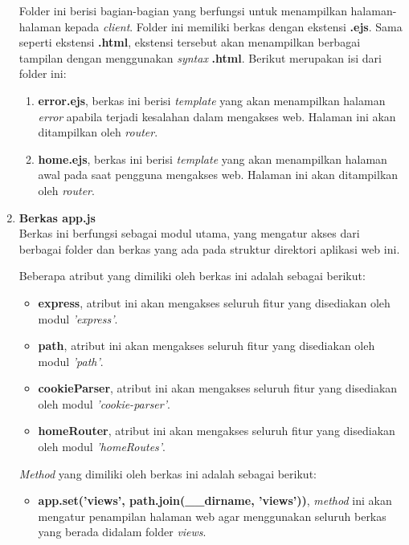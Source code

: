 \begin{enumerate}
	Folder ini berisi bagian-bagian yang berfungsi untuk menampilkan halaman-halaman kepada \textit{client}. Folder ini memiliki berkas dengan ekstensi \textbf{.ejs}. Sama seperti ekstensi \textbf{.html}, ekstensi tersebut akan menampilkan berbagai tampilan dengan menggunakan \textit{syntax} \textbf{.html}. Berikut merupakan isi dari folder ini:
	
	\begin{enumerate}
		\item \textbf{error.ejs}, berkas ini berisi \textit{template} yang akan menampilkan halaman \textit{error} apabila terjadi kesalahan dalam mengakses web. Halaman ini akan ditampilkan oleh \textit{router}.
		
		\item \textbf{home.ejs}, berkas ini berisi \textit{template} yang akan menampilkan halaman awal pada saat pengguna mengakses web. Halaman ini akan ditampilkan oleh \textit{router}.
	\end{enumerate}
	
	
	\item \textbf{Berkas app.js} \\ 
	Berkas ini berfungsi sebagai modul utama, yang mengatur akses dari berbagai folder dan berkas yang ada pada struktur direktori aplikasi web ini.
	
	Beberapa atribut yang dimiliki oleh berkas ini adalah sebagai berikut:
	\begin{itemize}
		\item \textbf{express}, atribut ini akan mengakses seluruh fitur yang disediakan oleh modul \textit{'express'}.
		
		\item \textbf{path}, atribut ini akan mengakses seluruh fitur yang disediakan oleh modul \textit{'path'}.
		
		\item \textbf{cookieParser}, atribut ini akan mengakses seluruh fitur yang disediakan oleh modul \textit{'cookie-parser'}.
		
		\item \textbf{homeRouter}, atribut ini akan mengakses seluruh fitur yang disediakan oleh modul \textit{'homeRoutes'}.
	\end{itemize}
	
	\textit{Method} yang dimiliki oleh berkas ini adalah sebagai berikut:
	\begin{itemize}
		\item \textbf{app.set('views', path.join(\_\_dirname, 'views'))}, \textit{method} ini akan mengatur penampilan halaman web agar menggunakan seluruh berkas yang berada didalam folder \textit{views}.
		

\end{itemize}
\end{enumerate}
